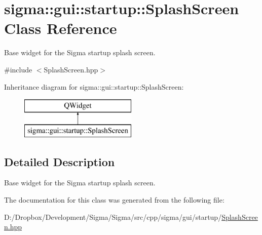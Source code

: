 \hypertarget{classsigma_1_1gui_1_1startup_1_1_splash_screen}{}\section{sigma\+:\+:gui\+:\+:startup\+:\+:Splash\+Screen Class Reference}
\label{classsigma_1_1gui_1_1startup_1_1_splash_screen}


Base widget for the Sigma startup splash screen.  




{\ttfamily \#include $<$Splash\+Screen.\+hpp$>$}

Inheritance diagram for sigma\+:\+:gui\+:\+:startup\+:\+:Splash\+Screen\+:\begin{figure}[H]
\begin{center}
\leavevmode
\includegraphics[height=2.000000cm]{classsigma_1_1gui_1_1startup_1_1_splash_screen}
\end{center}
\end{figure}


\subsection{Detailed Description}
Base widget for the Sigma startup splash screen. 

The documentation for this class was generated from the following file\+:\begin{DoxyCompactItemize}
\item 
D\+:/\+Dropbox/\+Development/\+Sigma/\+Sigma/src/cpp/sigma/gui/startup/\hyperlink{_splash_screen_8hpp}{Splash\+Screen.\+hpp}\end{DoxyCompactItemize}

